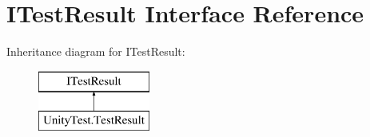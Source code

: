 \hypertarget{interface_i_test_result}{}\section{I\+Test\+Result Interface Reference}
\label{interface_i_test_result}
Inheritance diagram for I\+Test\+Result\+:\begin{figure}[H]
\begin{center}
\leavevmode
\includegraphics[height=2.000000cm]{interface_i_test_result}
\end{center}
\end{figure}
